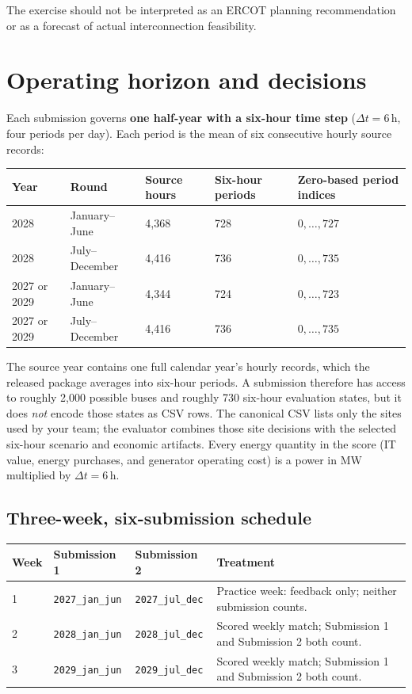 \documentclass[12pt]{article}
\newcommand{\code}[1]{\texttt{#1}}
\begin{document}
The exercise should not be interpreted as an ERCOT planning recommendation or
as a forecast of actual interconnection feasibility.

\section{Operating horizon and decisions}

Each submission governs \textbf{one half-year with a six-hour time step}
($\Delta t=6$\,h, four periods per day). Each period is the mean of six
consecutive hourly source records:
\begin{center}
\begin{tabular}{lllll}
\toprule
Year & Round & Source hours & Six-hour periods & Zero-based period indices\\
\midrule
2028 & January--June & 4,368 & 728 & $0,\ldots,727$\\
2028 & July--December & 4,416 & 736 & $0,\ldots,735$\\
2027 or 2029 & January--June & 4,344 & 724 & $0,\ldots,723$\\
2027 or 2029 & July--December & 4,416 & 736 & $0,\ldots,735$\\
\bottomrule
\end{tabular}
\end{center}

The source year contains one full calendar year's hourly records, which the
released package averages into six-hour periods. A submission therefore has
access to roughly 2,000 possible buses and roughly 730 six-hour evaluation
states, but it does \emph{not} encode those states as CSV rows. The canonical
CSV lists only the sites used by your team; the evaluator combines those site
decisions with the selected six-hour scenario and economic artifacts. Every
energy quantity in the score (IT value, energy purchases, and generator
operating cost) is a power in MW multiplied by $\Delta t=6$\,h.

\subsection{Three-week, six-submission schedule}
\begin{center}
\small
\begin{tabularx}{0.98\textwidth}{l l l X}
\toprule
Week & Submission 1 & Submission 2 & Treatment\\
\midrule
1 & \code{2027\_jan\_jun} & \code{2027\_jul\_dec} & Practice week: feedback only; neither submission counts.\\
2 & \code{2028\_jan\_jun} & \code{2028\_jul\_dec} & Scored weekly match; Submission 1 and Submission 2 both count.\\
3 & \code{2029\_jan\_jun} & \code{2029\_jul\_dec} & Scored weekly match; Submission 1 and Submission 2 both count.\\
\bottomrule
\end{tabularx}
\end{center}
\end{document}

